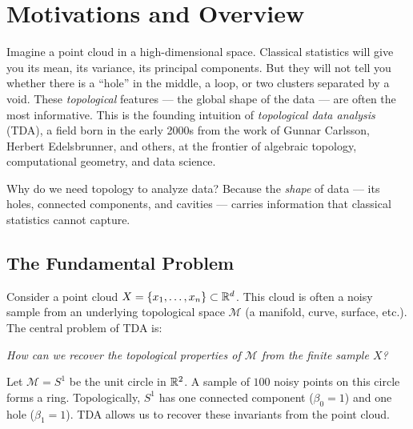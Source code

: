 \chapter{Motivations and Overview}
\label{ch:motivations}

Imagine a point cloud in a high-dimensional space. Classical statistics will
give you its mean, its variance, its principal components. But they will not
tell you whether there is a ``hole'' in the middle, a loop, or two clusters
separated by a void. These \emph{topological} features --- the global shape
of the data --- are often the most informative. This is the founding
intuition of \emph{topological data analysis} (TDA), a field born in the
early 2000s from the work of Gunnar Carlsson, Herbert Edelsbrunner, and
others, at the frontier of algebraic topology, computational geometry, and
data science.

\begin{intuition}
Why do we need topology to analyze data? Because the \emph{shape} of
data --- its holes, connected components, and cavities --- carries
information that classical statistics cannot capture.
\end{intuition}

\section{The Fundamental Problem}

Consider a point cloud $X = \{x_1, \ldots, x_n\} \subset \mathbb{R}^d$. This
cloud is often a noisy sample from an underlying topological space
$\mathcal{M}$ (a manifold, curve, surface, etc.). The central problem
of TDA is:

\begin{keyformulas}[title=\textbf{Fundamental Question}]
\emph{How can we recover the topological properties of $\mathcal{M}$
from the finite sample $X$?}
\end{keyformulas}

\begin{example}
Let $\mathcal{M} = S^1$ be the unit circle in $\mathbb{R}^2$. A sample of
$100$ noisy points on this circle forms a ring. Topologically, $S^1$
has one connected component ($\beta_0 = 1$) and one hole ($\beta_1 = 1$).
TDA allows us to recover these invariants from the point cloud.
\end{example}

